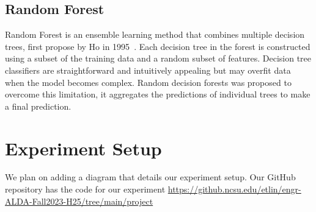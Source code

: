 \documentclass{article}
\begin{document}
\subsection{Random Forest}
\label{ssec:random-forest}

Random Forest is an ensemble learning method that combines multiple decision trees, first propose by Ho in 1995~\cite{ho1995random}. 
Each decision tree in the forest is constructed using a subset of the training data and a random subset of features. 
Decision tree classifiers are straightforward and intuitively appealing but may overfit data when the model becomes complex.
Random decision forests was proposed to overcome this limitation, it aggregates the predictions of individual trees to make a final prediction. 


\section{Experiment Setup}
\label{sec:setup}

We plan on adding a diagram that details our experiment setup.
Our GitHub repository has the code for our experiment \url{https://github.ncsu.edu/etlin/engr-ALDA-Fall2023-H25/tree/main/project}
\end{document}
